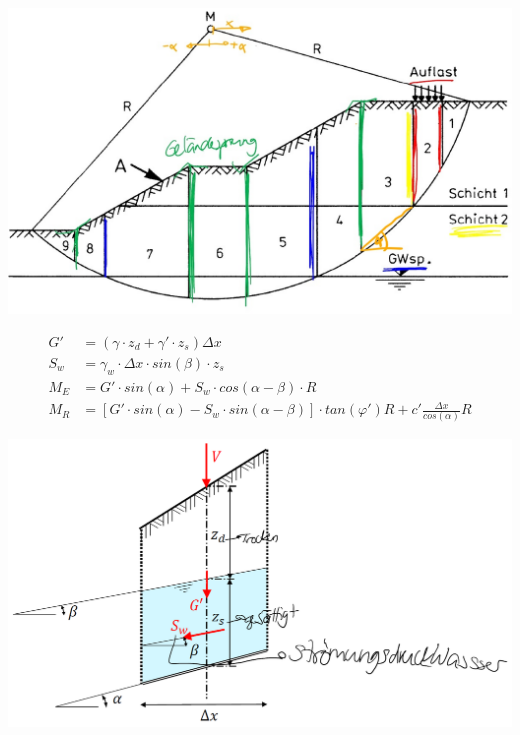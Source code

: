 	\begin{minipage}{0.3\linewidth}
		\includegraphics[width=\linewidth]{images/Boschstab1Lamelle.jpg} \\
	\end{minipage}
\begin{minipage}{0.4\linewidth}
	
	\begin{align*}		
		G' 	&= ( \gamma \cdot z_d + \gamma' \cdot z_s ) \Delta x  \\
		S_w	&= \gamma_w \cdot \Delta x \cdot sin(\beta) \cdot z_s \\
		M_E	&= G' \cdot sin(\alpha) + S_w \cdot cos(\alpha - \beta) \cdot R \\
		M_R	&= [G' \cdot sin(\alpha) - S_w \cdot sin(\alpha - \beta) ] \cdot tan(\varphi')R + c' \frac{\Delta x}{cos(\alpha)} R
	\end{align*}

\end{minipage}
	\begin{minipage}{0.3\linewidth}
	\includegraphics[width=\linewidth]{images/Boschstab2Krafte.PNG} \\
\end{minipage}


